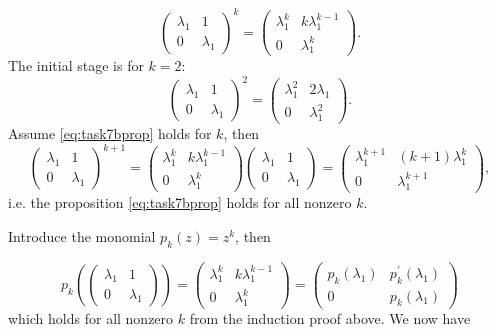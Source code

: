 \begin{equation}
  \label{eq:task7bprop}
  \begin{pmatrix}
    \lambda_{1} & 1\\
    0 & \lambda_{1}
  \end{pmatrix}^{k}
  =
  \begin{pmatrix}
    \lambda_{1}^{k} & k \lambda_{1}^{k-1}\\
    0 & \lambda_{1}^{k}
  \end{pmatrix}.
\end{equation}
The initial stage is for $k = 2$:
\begin{equation}
\begin{pmatrix}
  \lambda_{1} & 1\\
  0 & \lambda_{1}
\end{pmatrix}^{2}
=
\begin{pmatrix}
  \lambda_{1}^{2} & 2 \lambda_{1}\\
  0 & \lambda_{1}^{2}
\end{pmatrix}.
\end{equation}
Assume \eqref{eq:task7bprop} holds for $k$, then
\begin{equation}
  \begin{pmatrix}
    \lambda_{1} & 1\\
    0 & \lambda_{1}
  \end{pmatrix}^{k+1}
  =
  \begin{pmatrix}
    \lambda_{1}^{k} & k \lambda_{1}^{k-1}\\
    0 & \lambda_{1}^{k}
  \end{pmatrix}
  \begin{pmatrix}
    \lambda_{1} & 1\\
    0 & \lambda_{1}
  \end{pmatrix}
=
  \begin{pmatrix}
    \lambda_{1}^{k+1} & (k+1) \lambda_{1}^{k}\\
    0 & \lambda_{1}^{k+1}
  \end{pmatrix},
\end{equation}
i.e. the proposition \eqref{eq:task7bprop}  holds for all nonzero $k$.


Introduce the monomial $p_{k}(z) = z^{k}$, then

\begin{equation}
p_{k}\left(\begin{pmatrix}
  \lambda_{1} & 1\\
  0 & \lambda_{1}
\end{pmatrix}\right) = \begin{pmatrix}
  \lambda_{1}^{k} & k \lambda_{1}^{k-1}\\
  0 & \lambda_{1}^{k}
\end{pmatrix} = \begin{pmatrix}
  p_{k}(\lambda_{1}) &  p_{k}^{\prime}(\lambda_{1})\\
  0 & p_{k}(\lambda_{1})
\end{pmatrix}
\end{equation}
which holds for all nonzero $k$ from the induction proof above. We now have

